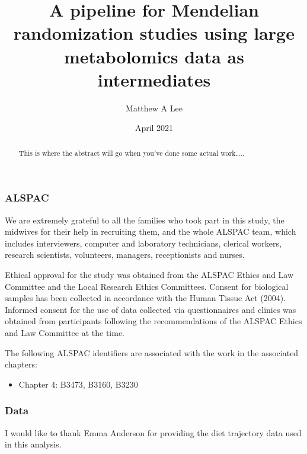 \documentclass[11pt,twoside]{bristolthesis}
\title{A pipeline for Mendelian randomization studies using large metabolomics data as intermediates}
\author{Matthew A Lee}
\date{April 2021}
\providecommand{\tightlist}{%
  \setlength{\itemsep}{0pt}\setlength{\parskip}{0pt}}
\begin{document}
  \maketitle

\frontmatter %
\pagestyle{empty} %
  \begin{abstract}
    This is where the abstract will go when you've done some actual work\ldots{}..
  \end{abstract}
  \begin{acknowledgements}
    \hypertarget{alspac}{%
    \subsubsection{ALSPAC}\label{alspac}}
    
    We are extremely grateful to all the families who took part in this study, the midwives for their help in recruiting them, and the whole ALSPAC team, which includes interviewers, computer and laboratory technicians, clerical workers, research scientists, volunteers, managers, receptionists and nurses.
    
    Ethical approval for the study was obtained from the ALSPAC Ethics and Law Committee and the Local Research Ethics Committees. Consent for biological samples has been collected in accordance with the Human Tissue Act (2004). Informed consent for the use of data collected via questionnaires and clinics was obtained from participants following the recommendations of the ALSPAC Ethics and Law Committee at the time.
    
    The following ALSPAC identifiers are associated with the work in the associated chapters:
    \begin{itemize}
    \tightlist
    \item
      Chapter 4: B3473, B3160, B3230
    \end{itemize}
    \hypertarget{data}{%
    \subsubsection{Data}\label{data}}
    
    I would like to thank Emma Anderson for providing the diet trajectory data used in this analysis.
  \end{acknowledgements}
\end{document}

